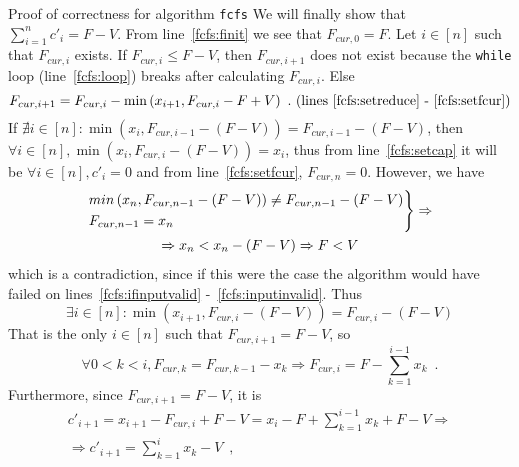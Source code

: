 \begin{sepproof}{Proof of correctness for algorithm \texttt{fcfs}}
  We will finally show that $\sum\limits_{i=1}^{n}c'_i = F - V$. From line~\ref{fcfs:finit} we see that $F_{cur,0} = F$.
  Let $i \in [n]$ such that $F_{cur, i}$ exists. If $F_{cur, i} \leq F - V$, then $F_{cur,i+1}$ does not exist because the
  \texttt{while} loop (line~\ref{fcfs:loop}) breaks after calculating $F_{cur,i}$. Else
  \begin{equation*}
    F_{cur,i+1} = F_{cur,i} - \min{\left(x_{i+1}, F_{cur,i} - F + V\right)} \enspace.
    \mbox{ (lines~\ref{fcfs:setreduce} -~\ref{fcfs:setfcur})}
  \end{equation*}
  If $\nexists i \in [n]: \min{\left(x_i, F_{cur, i-1} - \left(F - V\right)\right)} = F_{cur,i-1} - \left(F - V\right)$,
  then $\forall i \in [n], \min{\left(x_i, F_{cur, i} - \left(F - V\right)\right)} = x_i$, thus from line~\ref{fcfs:setcap}
  it will be $\forall i \in [n], c'_i = 0$ and from line~\ref{fcfs:setfcur}, $F_{cur, n} = 0$. However, we have
  \begin{equation*}
  \begin{gathered}
  \begin{rcases}
    min\left(x_n, F_{cur, n-1} - \left(F - V\right)\right) \neq F_{cur, n-1} - \left(F - V\right) \\
    F_{cur, n-1} = x_n
  \end{rcases} \Rightarrow \\
  \Rightarrow x_n < x_n - \left(F - V\right) \Rightarrow F < V
  \end{gathered}
  \end{equation*}
  which is a contradiction, since if this were the case the algorithm would have failed on lines~\ref{fcfs:ifinputvalid}
  -~\ref{fcfs:inputinvalid}. Thus
  \begin{equation*}
    \exists i \in [n]: \min{\left(x_{i+1}, F_{cur, i} - \left(F - V\right)\right)} = F_{cur,i} - \left(F - V\right)
  \end{equation*}
  That is the only $i \in [n]$ such that $F_{cur,i+1} = F - V$, so
  \begin{equation*}
    \forall 0 < k < i, F_{cur,k} = F_{cur,k-1} - x_k \Rightarrow F_{cur,i} = F - \sum\limits_{k=1}^{i-1}x_k \enspace.
  \end{equation*}
  Furthermore, since $F_{cur,i+1} = F - V$, it is
  \begin{equation*}
  \begin{gathered}
    c'_{i+1} = x_{i+1} - F_{cur,i} + F - V = x_i - F + \sum\limits_{k=1}^{i-1}x_k + F - V \Rightarrow \\
    \Rightarrow c'_{i+1} = \sum\limits_{k=1}^{i}x_k - V \enspace, \\

\end{gathered}
\end{equation*}
\end{sepproof}
